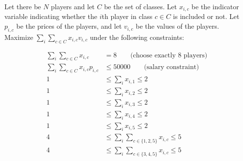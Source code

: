 \documentclass[a4paper]{article}
\begin{document}
Let there be $N$ players and let $C$ be the set of classes. Let $x_{i, c}$ be the indicator variable indicating whether the $i$th player in class $c\in C$ is included or not. Let $p_{i, c}$ be the prices of the players, and let $v_{i,c}$ be the values of the players.\\

Maximize $\sum_i \sum_{c\in C} x_{i, c} v_{i, c}$ under the following constraints:

\begin{align*}
\sum_i \sum_{c\in C} x_{i, c} &= 8 \hspace{2em}\textrm{(choose exactly 8 players)}\\
\sum_i \sum_{c\in C} x_{i, c} p_{i, c} &\leq 50000 \hspace{2em}\textrm{(salary constraint)}\\
1 &\leq \sum_i x_{i, 1} \leq 2\\
1 &\leq \sum_i x_{i, 2} \leq 2\\
1 &\leq \sum_i x_{i, 3} \leq 2\\
1 &\leq \sum_i x_{i, 4} \leq 2\\
1 &\leq \sum_i x_{i, 5} \leq 2\\
4 &\leq \sum_i \sum_{c\in\{1,2,5\}} x_{i, c} \leq 5\\
4 &\leq \sum_i \sum_{c\in\{3,4,5\}} x_{i, c} \leq 5\\
\end{align*}
\end{document}

